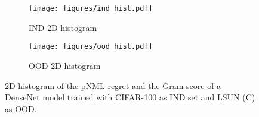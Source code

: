 \documentclass{article}
\begin{document}
\begin{figure}[tb]
    \centering
\begin{subfigure}[t]{0.49\linewidth}
    \texttt{[image: figures/ind\_hist.pdf]}
    \caption{IND 2D histogram  \label{fig:ind_hist}}   
\end{subfigure}
\begin{subfigure}[t]{0.49\linewidth}
    \texttt{[image: figures/ood\_hist.pdf]}
    \caption{OOD 2D histogram \label{fig:ood_hist}}   
\end{subfigure}
\caption{2D histogram of the pNML regret and the Gram score of a DenseNet model trained with CIFAR-100 as IND set and LSUN (C) as OOD.}
\label{fig:histograms}
\end{figure}
\end{document}
